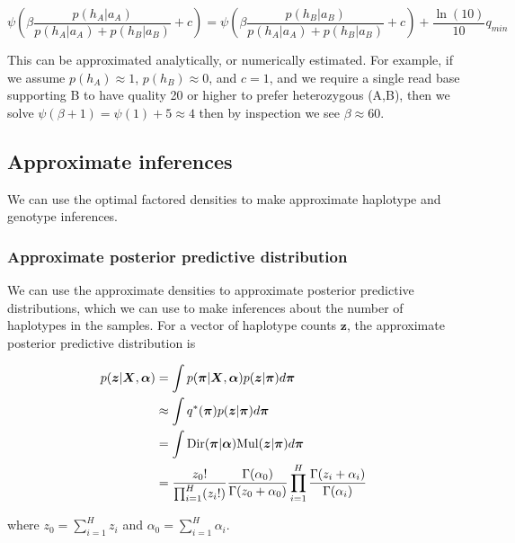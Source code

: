 \documentclass{article}
\begin{document}
\begin{equation}
    \psi \left(\beta \frac{p(h_A | a_A)}{p(h_A | a_A) + p(h_B | a_B)} + c \right) = \psi \left(\beta \frac{p(h_B | a_B)}{p(h_A | a_A) + p(h_B | a_B)} + c \right) + \frac{\ln(10)}{10}q_{min}
\end{equation}

This can be approximated analytically, or numerically estimated. For example, if we assume $p(h_A) \approx 1$, $p(h_B) \approx 0$, and $c = 1$, and we require a single read base supporting B to have quality 20 or higher to prefer heterozygous (A,B), then we solve $\psi(\beta + 1) = \psi(1) + 5 \approx 4$ then by inspection we see $\beta \approx 60$.

\subsection{Approximate inferences}

We can use the optimal factored densities to make approximate haplotype and genotype inferences. 

\subsubsection{Approximate posterior predictive distribution}

We can use the approximate densities to approximate posterior predictive distributions, which we can use to make inferences about the number of haplotypes in the samples. For a vector of haplotype counts $\boldsymbol{z}$, the approximate posterior predictive distribution is

\begin{align}
\label{eq:z_pp}
    p(\boldsymbol{z} | \boldsymbol{X}, \boldsymbol{\alpha}) &= \int p(\boldsymbol{\pi} | \boldsymbol{X}, \boldsymbol{\alpha}) p(\boldsymbol{z} | \boldsymbol{\pi}) d\boldsymbol{\pi}\notag\\
    &\approx \int q^*(\boldsymbol{\pi}) p(\boldsymbol{z} | \boldsymbol{\pi}) d\boldsymbol{\pi}\notag\\
    &= \int \text{Dir}(\boldsymbol{\pi} | \boldsymbol{\alpha}) \text{Mul}(\boldsymbol{z} | \boldsymbol{\pi}) d\boldsymbol{\pi}\notag\\
    &= \frac{z_0!}{\prod_{i = 1}^{H} (z_i!)} \frac{\Gamma(\alpha_0)}{\Gamma(z_0 + \alpha_0)} \prod_{i = 1}^H \frac{\Gamma(z_i + \alpha_i)}{\Gamma(\alpha_i)}
\end{align}

where $z_0 = \sum_{i = 1}^H z_i$ and $\alpha_0 = \sum_{i = 1}^H \alpha_i$.
\end{document}
